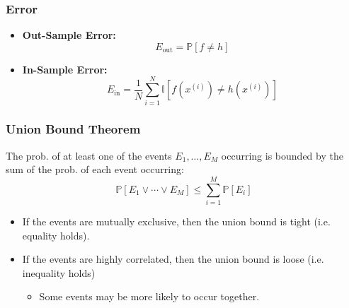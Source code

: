 \subsubsection{Error}
\begin{definition}
    \begin{itemize}
        \item \textbf{Out-Sample Error:}
        \begin{equation*}
            E_{\text{out}} = \mathbb{P}[f \neq h]
        \end{equation*}
        \item \textbf{In-Sample Error:}
        \begin{equation*}
            E_{\text{in}} = \frac{1}{N} \sum_{i=1}^{N} \mathbb{I}[f(x^{(i)}) \neq h(x^{(i)})]
        \end{equation*}
    \end{itemize}
\end{definition}

\subsubsection{Union Bound Theorem}
\begin{theorem}
    The prob. of at least one of the events $E_1, \ldots, E_M$ occurring is bounded by the sum of the prob. of each event occurring:
    \begin{equation*}
        \mathbb{P} \left[E_1 \lor \cdots \lor E_M \right] \leq \sum_{i=1}^{M} \mathbb{P}[E_i]
    \end{equation*}
\end{theorem}

\begin{notes}
    \begin{itemize}
        \item If the events are mutually exclusive, then the union bound is tight (i.e. equality holds).
        \item If the events are highly correlated, then the union bound is loose (i.e. inequality holds)
        \begin{itemize}
            \item Some events may be more likely to occur together.
        \end{itemize}
    \end{itemize}
\end{notes}
\newpage

